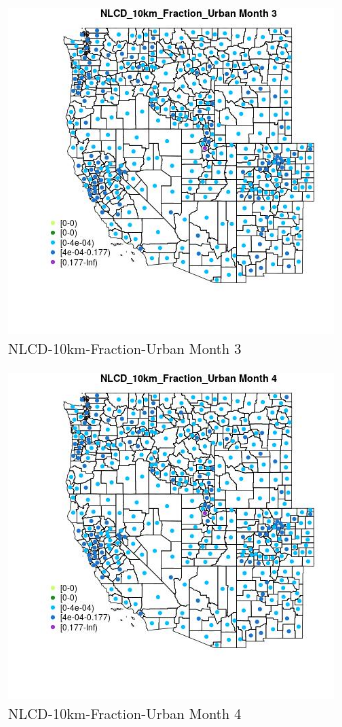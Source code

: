 \begin{figure} 
\centering  
\includegraphics[width=0.77\textwidth]{Code_Outputs/df_report_ML_predictors_CountyCentroid_Locations_Dates_2008-01-01to2018-12-31_MapObsMo3NLCD_10km_Fraction_Urban.jpg} 
\caption{\label{fig:df_report_ML_predictors_CountyCentroid_Locations_Dates_2008-01-01to2018-12-31MapObsMo3NLCD_10km_Fraction_Urban}NLCD-10km-Fraction-Urban Month 3} 
\end{figure} 
 

\begin{figure} 
\centering  
\includegraphics[width=0.77\textwidth]{Code_Outputs/df_report_ML_predictors_CountyCentroid_Locations_Dates_2008-01-01to2018-12-31_MapObsMo4NLCD_10km_Fraction_Urban.jpg} 
\caption{\label{fig:df_report_ML_predictors_CountyCentroid_Locations_Dates_2008-01-01to2018-12-31MapObsMo4NLCD_10km_Fraction_Urban}NLCD-10km-Fraction-Urban Month 4} 
\end{figure} 
 

